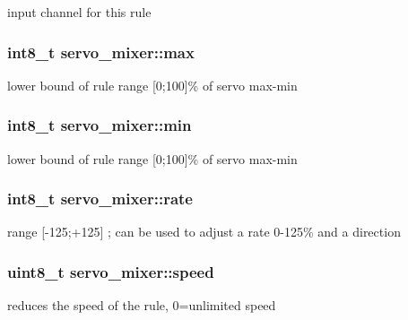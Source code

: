 input channel for this rule 

\hypertarget{structservo__mixer_ac8f02f090be0f5f944e2b8fb21659926}{
\subsubsection[{max}]{\setlength{\rightskip}{0pt plus 5cm}int8\+\_\+t servo\+\_\+mixer\+::max}}\label{structservo__mixer_ac8f02f090be0f5f944e2b8fb21659926}


lower bound of rule range \mbox{[}0;100\mbox{]}\% of servo max-\/min 

\hypertarget{structservo__mixer_a20a1254955434895a2f7b7145b3f8c3d}{
\subsubsection[{min}]{\setlength{\rightskip}{0pt plus 5cm}int8\+\_\+t servo\+\_\+mixer\+::min}}\label{structservo__mixer_a20a1254955434895a2f7b7145b3f8c3d}


lower bound of rule range \mbox{[}0;100\mbox{]}\% of servo max-\/min 

\hypertarget{structservo__mixer_adb092f1954c0c41ea3da120b9888e824}{
\subsubsection[{rate}]{\setlength{\rightskip}{0pt plus 5cm}int8\+\_\+t servo\+\_\+mixer\+::rate}}\label{structservo__mixer_adb092f1954c0c41ea3da120b9888e824}


range \mbox{[}-\/125;+125\mbox{]} ; can be used to adjust a rate 0-\/125\% and a direction 

\hypertarget{structservo__mixer_a8f7ee6886f8316ddecbfe76a7a64e586}{
\subsubsection[{speed}]{\setlength{\rightskip}{0pt plus 5cm}uint8\+\_\+t servo\+\_\+mixer\+::speed}}\label{structservo__mixer_a8f7ee6886f8316ddecbfe76a7a64e586}


reduces the speed of the rule, 0=unlimited speed 

